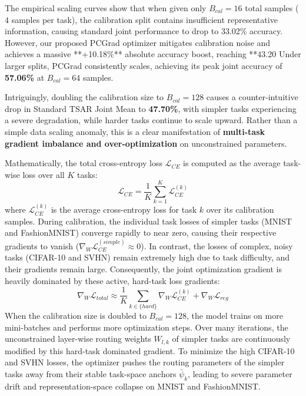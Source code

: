 The empirical scaling curves show that when given only $B_{cal}=16$ total samples ($4$ samples per
task), the calibration split contains insufficient representative information, causing standard
joint performance to drop to 33.02\% accuracy. However, our proposed PCGrad optimizer mitigates
calibration noise and achieves a massive **+10.18\%** absolute accuracy boost, reaching **43.20%
Under larger splits, PCGrad consistently scales, achieving its peak joint accuracy of
\textbf{57.06\%} at $B_{cal}=64$ samples. 

Intriguingly, doubling the calibration size to $B_{cal}=128$ causes a counter-intuitive drop in
Standard TSAR Joint Mean to \textbf{47.70\%}, with simpler tasks experiencing a severe degradation,
while harder tasks continue to scale upward. Rather than a simple data scaling anomaly, this is a
clear manifestation of \textbf{multi-task gradient imbalance and over-optimization} on unconstrained
parameters.  

Mathematically, the total cross-entropy loss $\mathcal{L}_{CE}$ is computed as the average
task-wise loss over all $K$ tasks:
\begin{equation}
\mathcal{L}_{CE} = \frac{1}{K} \sum_{k=1}^K \mathcal{L}_{CE}^{(k)}
\label{eq:avg_loss}
\end{equation}
where $\mathcal{L}_{CE}^{(k)}$ is the average cross-entropy loss for task $k$ over its calibration
samples. During calibration, the individual task losses of simpler tasks (MNIST and FashionMNIST)
converge rapidly to near zero, causing their respective gradients to vanish ($\nabla_{W}
\mathcal{L}_{CE}^{(simple)} \approx 0$). In contrast, the losses of complex, noisy tasks (CIFAR-10
and SVHN) remain extremely high due to task difficulty, and their gradients remain large.
Consequently, the joint optimization gradient is heavily dominated by these active, hard-task loss
gradients:
\begin{equation}
\nabla_{W} \mathcal{L}_{total} \approx \frac{1}{K} \sum_{k \in \{hard\}} \nabla_{W} \mathcal{L}_{CE}^{(k)} + \nabla_{W} \mathcal{L}_{reg}
\label{eq:grad_imbalance}
\end{equation}
When the calibration size is doubled to $B_{cal}=128$, the model trains on more mini-batches and
performs more optimization steps. Over many iterations, the unconstrained layer-wise routing weights
$W_{l, k}$ of simpler tasks are continuously modified by this hard-task dominated gradient. To
minimize the high CIFAR-10 and SVHN losses, the optimizer pushes the routing parameters of the
simpler tasks away from their stable task-space anchors $\bar{\psi}_k$, leading to severe parameter
drift and representation-space collapse on MNIST and FashionMNIST. 

